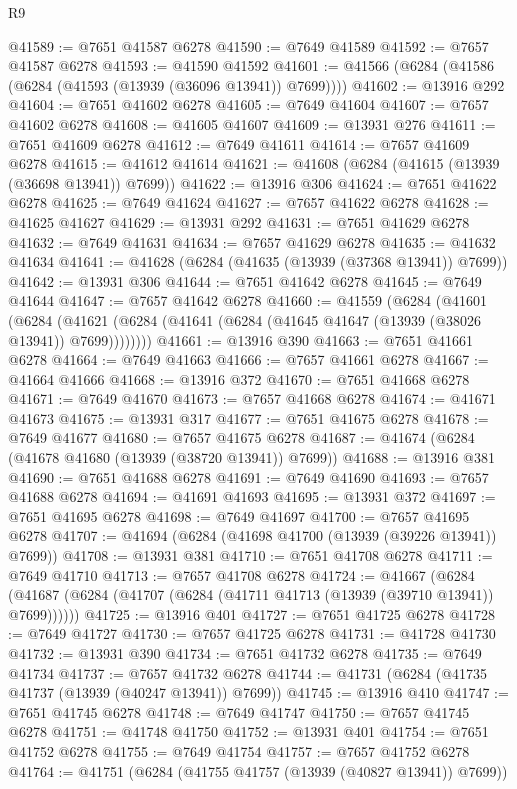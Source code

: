 \begin{lexlean}{R9}
\begin{coremodule}
@41589 := @7651 @41587 @6278
@41590 := @7649 @41589
@41592 := @7657 @41587 @6278
@41593 := @41590 @41592
@41601 := @41566 (@6284 (@41586 (@6284 (@41593 (@13939 (@36096 @13941)) @7699))))
@41602 := @13916 @292
@41604 := @7651 @41602 @6278
@41605 := @7649 @41604
@41607 := @7657 @41602 @6278
@41608 := @41605 @41607
@41609 := @13931 @276
@41611 := @7651 @41609 @6278
@41612 := @7649 @41611
@41614 := @7657 @41609 @6278
@41615 := @41612 @41614
@41621 := @41608 (@6284 (@41615 (@13939 (@36698 @13941)) @7699))
@41622 := @13916 @306
@41624 := @7651 @41622 @6278
@41625 := @7649 @41624
@41627 := @7657 @41622 @6278
@41628 := @41625 @41627
@41629 := @13931 @292
@41631 := @7651 @41629 @6278
@41632 := @7649 @41631
@41634 := @7657 @41629 @6278
@41635 := @41632 @41634
@41641 := @41628 (@6284 (@41635 (@13939 (@37368 @13941)) @7699))
@41642 := @13931 @306
@41644 := @7651 @41642 @6278
@41645 := @7649 @41644
@41647 := @7657 @41642 @6278
@41660 := @41559
    (@6284
      (@41601
        (@6284 (@41621 (@6284 (@41641 (@6284 (@41645 @41647 (@13939 (@38026 @13941)) @7699))))))))
@41661 := @13916 @390
@41663 := @7651 @41661 @6278
@41664 := @7649 @41663
@41666 := @7657 @41661 @6278
@41667 := @41664 @41666
@41668 := @13916 @372
@41670 := @7651 @41668 @6278
@41671 := @7649 @41670
@41673 := @7657 @41668 @6278
@41674 := @41671 @41673
@41675 := @13931 @317
@41677 := @7651 @41675 @6278
@41678 := @7649 @41677
@41680 := @7657 @41675 @6278
@41687 := @41674 (@6284 (@41678 @41680 (@13939 (@38720 @13941)) @7699))
@41688 := @13916 @381
@41690 := @7651 @41688 @6278
@41691 := @7649 @41690
@41693 := @7657 @41688 @6278
@41694 := @41691 @41693
@41695 := @13931 @372
@41697 := @7651 @41695 @6278
@41698 := @7649 @41697
@41700 := @7657 @41695 @6278
@41707 := @41694 (@6284 (@41698 @41700 (@13939 (@39226 @13941)) @7699))
@41708 := @13931 @381
@41710 := @7651 @41708 @6278
@41711 := @7649 @41710
@41713 := @7657 @41708 @6278
@41724 := @41667
    (@6284 (@41687 (@6284 (@41707 (@6284 (@41711 @41713 (@13939 (@39710 @13941)) @7699))))))
@41725 := @13916 @401
@41727 := @7651 @41725 @6278
@41728 := @7649 @41727
@41730 := @7657 @41725 @6278
@41731 := @41728 @41730
@41732 := @13931 @390
@41734 := @7651 @41732 @6278
@41735 := @7649 @41734
@41737 := @7657 @41732 @6278
@41744 := @41731 (@6284 (@41735 @41737 (@13939 (@40247 @13941)) @7699))
@41745 := @13916 @410
@41747 := @7651 @41745 @6278
@41748 := @7649 @41747
@41750 := @7657 @41745 @6278
@41751 := @41748 @41750
@41752 := @13931 @401
@41754 := @7651 @41752 @6278
@41755 := @7649 @41754
@41757 := @7657 @41752 @6278
@41764 := @41751 (@6284 (@41755 @41757 (@13939 (@40827 @13941)) @7699))

\end{coremodule}
\end{lexlean}
